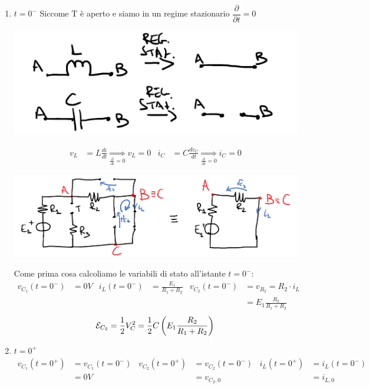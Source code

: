 \documentclass{article}
\begin{document}
\begin{enumerate}[label=\protect\circled{\arabic*}]
    \item $t=0^-$
    Siccome T è aperto e siamo in un regime stazionario $\dfrac{\partial}{\partial t}=0$
    \begin{center}
        \includegraphics[scale=0.2]{Image/Es_4_Trans_1.png}
    \end{center}
    \begin{align*}
        v_L &=L\frac{di}{dt} \underset{\frac{\partial}{\partial t}=0}{\Rightarrow}v_L=0 & i_C &= C \frac{dv_C}{dt} \underset{\frac{\partial}{\partial t}=0}{\Rightarrow} i_C=0
    \end{align*}
    \begin{center}
        \includegraphics[scale=0.2]{Image/Es_4_Trans_2.png}
    \end{center}
    Come prima cosa calcoliamo le variabili di stato all'istante $t=0^-$:
    \begin{align*}
        v_{C_1}(t=0^-) &= 0V & i_L(t=0^-) &= \frac{E_1}{R_1+R_2} & v_{C_2}(t=0^-) &= v_{R_2} = R_2 \cdot i_L\\
        & & & & &=E_1 \frac{R_2}{R_1+R_2}
    \end{align*}
    \[
        \mathcal{E}_{C_2} = \frac{1}{2}V_C^2=\frac{1}{2}C\left(E_1\frac{R_2}{R_1+R_2}\right)
    \]
    \item $t=0^+$
    \begin{align*}
        v_{C_1}(t=0^+)&=v_{C_1}(t=0^-) & v_{C_2}(t=0^+)&=v_{C_2}(t=0^-) & i_L(t=0^+)&=i_L(t=0^-)\\
        &=0V & &=v_{C_2,0} & &=i_{L,0}\\

\end{align*}
\end{enumerate}
\end{document}
